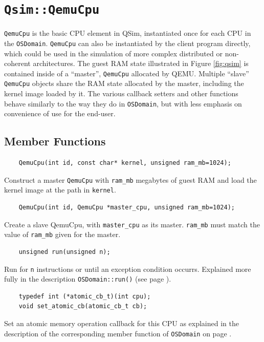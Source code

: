\documentclass[letterpaper, 10pt]{book}
\begin{document}
\section{\texttt{Qsim::QemuCpu}} \label{class:QemuCpu}
\texttt{QemuCpu} is the basic CPU element in QSim, instantiated once for each
CPU in the \texttt{OSDomain}. \texttt{QemuCpu} can also be instantiated by the
client program directly, which could be used in the simulation of more
complex distributed or non-coherent architectures. The guest RAM state 
illustrated in Figure \ref{fig:qsim} is contained inside of a ``master'',
\texttt{QemuCpu} allocated by QEMU. Multiple ``slave'' \texttt{QemuCpu}
objects share the RAM state allocated by the master, including the kernel
image loaded by it. The various callback setters and other functions behave
similarly to the way they do in \texttt{OSDomain}, but with less emphasis on
convenience of use for the end-user.

\subsection{Member Functions}
\begin{verbatim}
    QemuCpu(int id, const char* kernel, unsigned ram_mb=1024);
\end{verbatim}
Construct a master \texttt{QemuCpu} with \texttt{ram\_mb} megabytes of guest 
RAM and load the kernel image at the path in \texttt{kernel}. 

\begin{verbatim}
    QemuCpu(int id, QemuCpu *master_cpu, unsigned ram_mb=1024);
\end{verbatim}
Create a slave QemuCpu, with \texttt{master\_cpu} as its master. 
\texttt{ram\_mb} must match the value of \texttt{ram\_mb} given for the master.

\begin{verbatim}
    unsigned run(unsigned n);
\end{verbatim}
Run for \texttt{n} instructions or until an exception condition occurrs. 
Explained more fully in the description \texttt{OSDomain::run()} (see page
\pageref{func:run}).

\begin{verbatim}
    typedef int (*atomic_cb_t)(int cpu);
    void set_atomic_cb(atomic_cb_t cb);
\end{verbatim}
Set an atomic memory operation callback for this CPU as explained in the 
description of the corresponding member function of \texttt{OSDomain} on page
\pageref{func:set_atomic_cb}.
\end{document}
